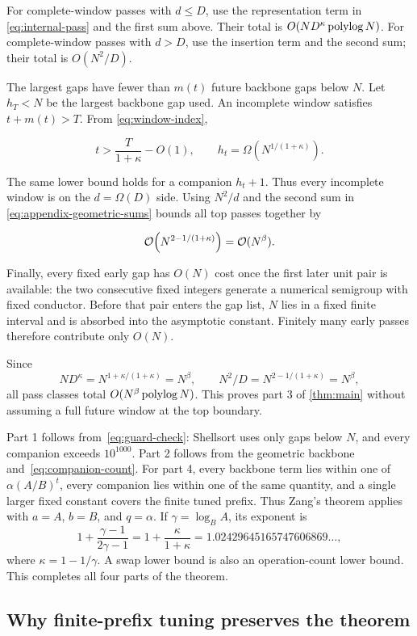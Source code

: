 For complete-window passes with $d\le D$, use the representation term in
\eqref{eq:internal-pass} and the first sum above.  Their total is
$O(ND^\kappa\operatorname{polylog} N)$.  For complete-window passes with $d>D$, use the
insertion term and the second sum; their total is $O(N^2/D)$.

The largest gaps have fewer than $m(t)$ future backbone gaps below $N$.  Let
$h_T<N$ be the largest backbone gap used.  An incomplete window satisfies
$t+m(t)>T$.  From \eqref{eq:window-index},

\[
  t>\frac{T}{1+\kappa}-O(1),
  \qquad
  h_t=\Omega\!\left(N^{1/(1+\kappa)}\right).
\]

The same lower bound holds for a companion $h_t+1$.  Thus every incomplete
window is on the $d=\Omega(D)$ side.  Using $N^2/d$ and the second sum in
\eqref{eq:appendix-geometric-sums} bounds all top passes together by

\[
  \mathcal{O}\!\left(
    N^{2-1/(1+\kappa)}
  \right)
  =\mathcal{O}(N^\beta).
\]

Finally, every fixed early gap has $O(N)$ cost once the first later unit pair is
available: the two consecutive fixed integers generate a numerical semigroup
with fixed conductor.  Before that pair enters the gap list, $N$ lies in a
fixed finite interval and is absorbed into the asymptotic constant.  Finitely
many early passes therefore contribute only $O(N)$.

Since
\[
  ND^\kappa=N^{1+\kappa/(1+\kappa)}=N^\beta,
  \qquad
  N^2/D=N^{2-1/(1+\kappa)}=N^\beta,
\]
all pass classes total $O(N^\beta\operatorname{polylog} N)$.  This proves part 3 of
\cref{thm:main} without assuming a full future window at the top boundary.

Part 1 follows from~\eqref{eq:guard-check}: Shellsort uses only gaps below $N$,
and every companion exceeds $10^{1000}$.  Part 2 follows from the geometric
backbone and~\eqref{eq:companion-count}.  For part 4, every backbone term lies
within one of $\alpha(A/B)^t$, every companion lies within one of the same
quantity, and a single larger fixed constant covers the finite tuned prefix.
Thus Zang's theorem applies with $a=A$, $b=B$, and $q=\alpha$.  If
$\gamma=\log_B A$, its exponent is
\[
  1+\frac{\gamma-1}{2\gamma-1}
  =1+\frac{\kappa}{1+\kappa}
  =1.02429645165747606869\ldots,
\]
where $\kappa=1-1/\gamma$.  A swap lower bound is also an operation-count
lower bound.  This completes all four parts of the theorem.

\subsection{Why finite-prefix tuning preserves the theorem}


